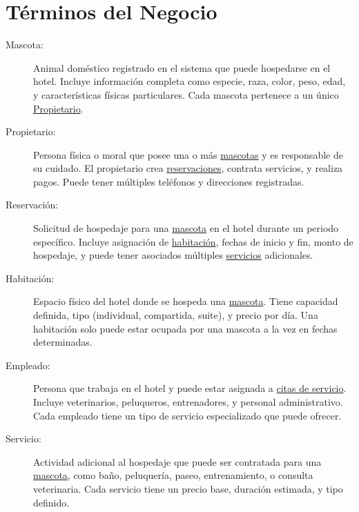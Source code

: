 \section{Términos del Negocio}
\label{sec:terminosDeNegocio}

\begin{description}
	
	\item[\hypertarget{tMascota}{Mascota:}] Animal doméstico registrado en el sistema que puede hospedarse en el hotel. Incluye información completa como especie, raza, color, peso, edad, y características físicas particulares. Cada mascota pertenece a un único \hyperlink{tPropietario}{Propietario}.
	
	\item[\hypertarget{tPropietario}{Propietario:}] Persona física o moral que posee una o más \hyperlink{tMascota}{mascotas} y es responsable de su cuidado. El propietario crea \hyperlink{tReservacion}{reservaciones}, contrata servicios, y realiza pagos. Puede tener múltiples teléfonos y direcciones registradas.
	
	\item[\hypertarget{tReservacion}{Reservación:}] Solicitud de hospedaje para una \hyperlink{tMascota}{mascota} en el hotel durante un periodo específico. Incluye asignación de \hyperlink{tHabitacion}{habitación}, fechas de inicio y fin, monto de hospedaje, y puede tener asociados múltiples \hyperlink{tServicio}{servicios} adicionales.
	
	\item[\hypertarget{tHabitacion}{Habitación:}] Espacio físico del hotel donde se hospeda una \hyperlink{tMascota}{mascota}. Tiene capacidad definida, tipo (individual, compartida, suite), y precio por día. Una habitación solo puede estar ocupada por una mascota a la vez en fechas determinadas.
	
	\item[\hypertarget{tEmpleado}{Empleado:}] Persona que trabaja en el hotel y puede estar asignada a \hyperlink{tCitaServicio}{citas de servicio}. Incluye veterinarios, peluqueros, entrenadores, y personal administrativo. Cada empleado tiene un tipo de servicio especializado que puede ofrecer.
	
	
	\item[\hypertarget{tServicio}{Servicio:}] Actividad adicional al hospedaje que puede ser contratada para una \hyperlink{tMascota}{mascota}, como baño, peluquería, paseo, entrenamiento, o consulta veterinaria. Cada servicio tiene un precio base, duración estimada, y tipo definido.
	

\end{description}
